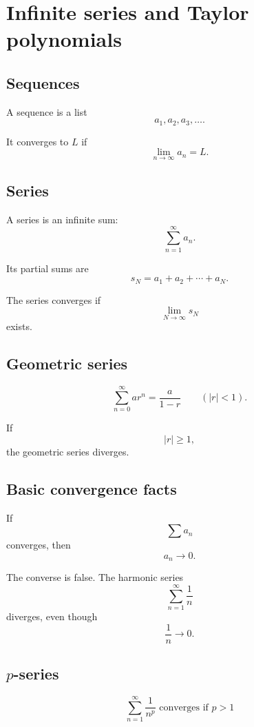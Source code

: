 \section{Infinite series and Taylor polynomials}
\label{app:A.6}

\subsection*{Sequences}

A sequence is a list
\[
    a_1,a_2,a_3,\ldots.
\]

It converges to \(L\) if
\[
\boxed{
    \lim_{n\to\infty}a_n=L.
}
\]

\subsection*{Series}

A series is an infinite sum:
\[
\boxed{
    \sum_{n=1}^{\infty}a_n.
}
\]

Its partial sums are
\[
    s_N=a_1+a_2+\cdots+a_N.
\]

The series converges if
\[
    \lim_{N\to\infty}s_N
\]
exists.

\subsection*{Geometric series}

\[
\boxed{
    \sum_{n=0}^{\infty} ar^n=\frac{a}{1-r}
    \qquad
    (|r|<1).
}
\]

If
\[
    |r|\ge1,
\]
the geometric series diverges.

\subsection*{Basic convergence facts}

If
\[
    \sum a_n
\]
converges, then
\[
\boxed{
    a_n\to0.
}
\]

The converse is false.  The harmonic series
\[
    \sum_{n=1}^{\infty}\frac1n
\]
diverges, even though
\[
    \frac1n\to0.
\]

\subsection*{\(p\)-series}

\[
\boxed{
    \sum_{n=1}^{\infty}\frac1{n^p}
    \text{ converges if }p>1
}
\]

